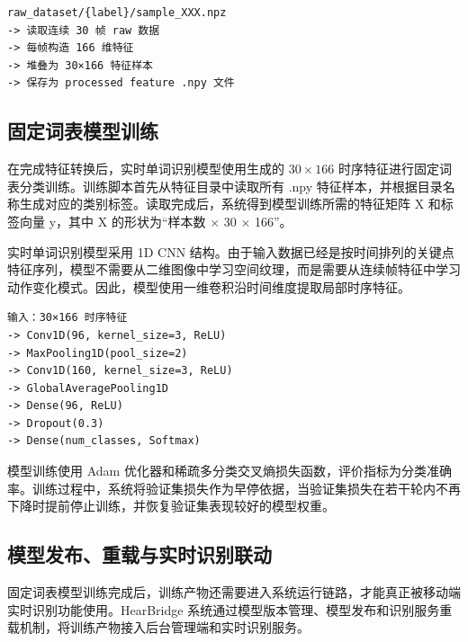\begin{lstlisting}[style=whuCode,caption={实时单词识别特征转换流程},label={lst:chapter06-realtime-feature-convert}]
raw_dataset/{label}/sample_XXX.npz
-> 读取连续 30 帧 raw 数据
-> 每帧构造 166 维特征
-> 堆叠为 30×166 特征样本
-> 保存为 processed feature .npy 文件
\end{lstlisting}

\subsection{固定词表模型训练}




在完成特征转换后，实时单词识别模型使用生成的 $30\times166$ 时序特征进行固定词表分类训练。训练脚本首先从特征目录中读取所有 .npy 特征样本，并根据目录名称生成对应的类别标签。读取完成后，系统得到模型训练所需的特征矩阵 X 和标签向量 y，其中 X 的形状为“样本数 $\times$ 30 $\times$ 166”。

实时单词识别模型采用 1D CNN 结构。由于输入数据已经是按时间排列的关键点特征序列，模型不需要从二维图像中学习空间纹理，而是需要从连续帧特征中学习动作变化模式。因此，模型使用一维卷积沿时间维度提取局部时序特征。

\begin{lstlisting}[style=whuCode,caption={实时单词识别模型结构},label={lst:chapter06-realtime-model-structure}]
输入：30×166 时序特征
-> Conv1D(96, kernel_size=3, ReLU)
-> MaxPooling1D(pool_size=2)
-> Conv1D(160, kernel_size=3, ReLU)
-> GlobalAveragePooling1D
-> Dense(96, ReLU)
-> Dropout(0.3)
-> Dense(num_classes, Softmax)
\end{lstlisting}

模型训练使用 Adam 优化器和稀疏多分类交叉熵损失函数，评价指标为分类准确率。训练过程中，系统将验证集损失作为早停依据，当验证集损失在若干轮内不再下降时提前停止训练，并恢复验证集表现较好的模型权重。

\subsection{模型发布、重载与实时识别联动}




固定词表模型训练完成后，训练产物还需要进入系统运行链路，才能真正被移动端实时识别功能使用。HearBridge 系统通过模型版本管理、模型发布和识别服务重载机制，将训练产物接入后台管理端和实时识别服务。

